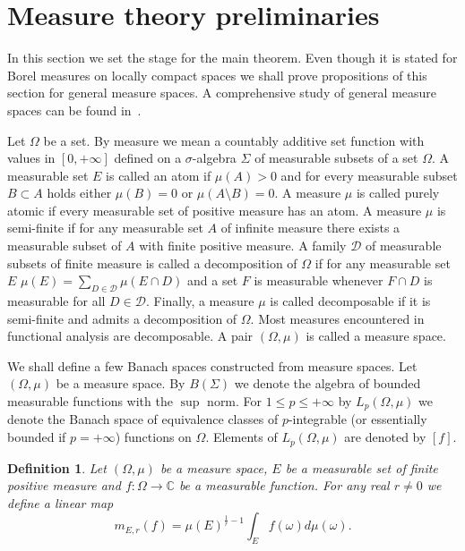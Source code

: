 \documentclass[12pt]{article}
\newtheorem{definition}[theorem]{Definition}
\begin{document}

\section{Measure theory preliminaries}
\label{MeasThPrelim}

In this section we set the stage for the main theorem. Even though it is stated
for Borel measures on locally compact spaces we shall prove propositions of this 
section for general measure spaces. A comprehensive study of general measure 
spaces can be found in~\cite{FremMeasTh2}. 

Let $\Omega$ be a set. By measure we mean a countably additive set function with
values in $[0,+\infty]$ defined on a $\sigma$-algebra $\Sigma$ of measurable
subsets of a set $\Omega$. A measurable set $E$ is called an atom if
$\mu(A)>0$ and for every measurable subset $B\subset A$ holds either $\mu(B)=0$
or $\mu(A\setminus B)=0$. A measure $\mu$ is called purely atomic if every
measurable set of positive measure has an atom. A measure $\mu$ is semi-finite
if for any measurable set $A$ of infinite measure there exists a measurable
subset of $A$ with finite positive measure. A family $\mathcal{D}$ of measurable
subsets of finite measure is called a decomposition of $\Omega$ if for any 
measurable set $E$ $\mu(E)=\sum_{D\in\mathcal{D}}\mu(E\cap D)$ and a set $F$ 
is measurable whenever $F\cap D$ is measurable for all $D\in\mathcal{D}$. 
Finally, a measure $\mu$ is called decomposable if it is semi-finite and admits 
a decomposition of $\Omega$. Most measures encountered in functional analysis 
are decomposable. A pair $(\Omega,\mu)$ is called a measure space.

We shall define a few Banach spaces constructed from measure spaces. 
Let $(\Omega,\mu)$ be a measure space. By $B(\Sigma)$ we denote the algebra of
bounded measurable functions with the  $\sup$ norm. For $1\leq p\leq +\infty$ 
by $L_p(\Omega,\mu)$ we denote the Banach space of equivalence
classes of $p$-integrable (or essentially bounded if $p=+\infty$) functions on
$\Omega$. Elements of $L_p(\Omega,\mu)$ are denoted by $[f]$.

\begin{definition}\label{GnrlzdMean}
    Let $(\Omega,\mu)$ be a measure space, $E$ be a measurable set of finite 
    positive measure and $f:\Omega\to\mathbb{C}$ be a measurable function. 
    For any real $r\neq 0$ we define a linear map
    \[
        m_{E,r}(f)=\mu(E)^{\frac{1}{r}-1}\int_E f(\omega)d\mu(\omega).
    \]
\end{definition}
\end{document}
